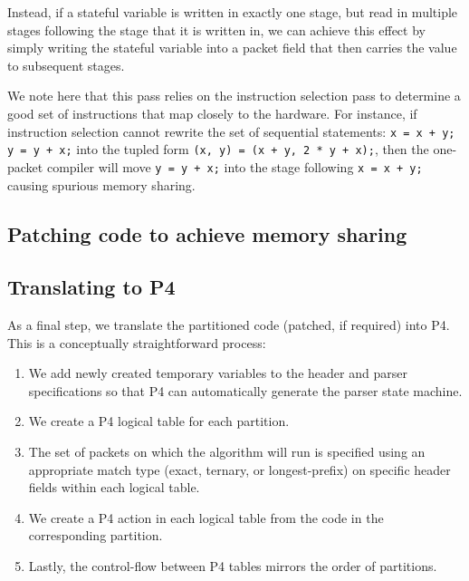 Instead, if a stateful variable is written in exactly one stage, but read in
multiple stages following the stage that it is written in, we can achieve this
effect by simply writing the stateful variable into a packet field that then
carries the value to subsequent stages.

We note here that this pass relies on the instruction selection pass to
determine a good set of instructions that map closely to the hardware. For
instance, if instruction selection cannot rewrite the set of sequential
statements: \texttt{x = x + y; y = y + x;} into the tupled form \texttt{(x, y)
= (x + y, 2 * y + x);}, then the one-packet compiler will move \texttt{y = y +
x;} into the stage following \texttt{x = x + y;} causing spurious memory
sharing.

\subsection{Patching code to achieve memory sharing}

\subsection{Translating to P4}
As a final step, we translate the partitioned code (patched, if required)
into P4. This is a conceptually straightforward process:
\begin{enumerate}
\item We add newly created temporary variables to the header and parser
specifications so that P4 can automatically generate the parser state machine.
\item We create a P4 logical table for each partition.
\item The set of packets on which the algorithm will run is specified using
an appropriate match type (exact, ternary, or longest-prefix) on specific
header fields within each logical table.
\item We create a P4 action in each logical table from the code in the
corresponding partition.
\item Lastly, the control-flow between P4 tables mirrors the order of
partitions.
\end{enumerate}

%
